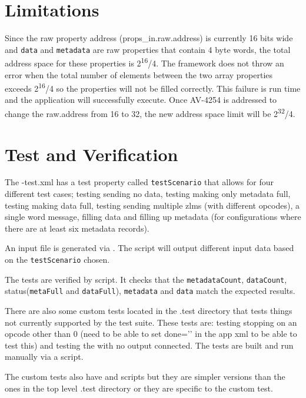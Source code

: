 \section*{Limitations}

Since the raw property address (props\_in.raw.address) is currently 16 bits wide and \texttt{data} and \texttt{metadata} are raw properties that contain 4 byte words, the total address space for these properties is 2\textsuperscript{16}/4. The framework does not throw an error when the total number of elements between the two array properties exceeds 2\textsuperscript{16}/4 so the properties will not be filled correctly. This failure is run time and the application will successfully execute. Once AV-4254 is addressed to change the raw.address from 16 to 32, the new address space limit will be 2\textsuperscript{32}/4.

\section*{Test and Verification}
\normalsize

\begin{flushleft}

The {\comp}-test.xml has a test property called \texttt{testScenario} that allows for four different test cases; testing sending no data, testing making only metadata full, testing making data full, testing sending multiple zlms (with different opcodes), a single word message, filling data and filling up metadata (for configurations where there are at least six metadata records).
\newline

An input file is generated via . The  script will output different input data based on the \texttt{testScenario} chosen.
\newline

The tests are verified by  script. It checks that the \texttt{metadataCount}, \texttt{dataCount}, status(\texttt{metaFull} and \texttt{dataFull}), \texttt{metadata} and \texttt{data} match the expected results. \newline


There are also some custom tests located in the {\comp}.test directory that tests things not currently supported by the test suite. These tests are: testing stopping on an opcode other than 0 (need to be able to set done='{\comp}' in the app xml to be able to test this) and testing the {\comp} with no output connected. The tests are built and run manually via a  script.
\newline

The custom tests also have  and  scripts but they are simpler versions than the ones in the top level {\comp}.test directory or they are specific to the custom test.

\end{flushleft}

